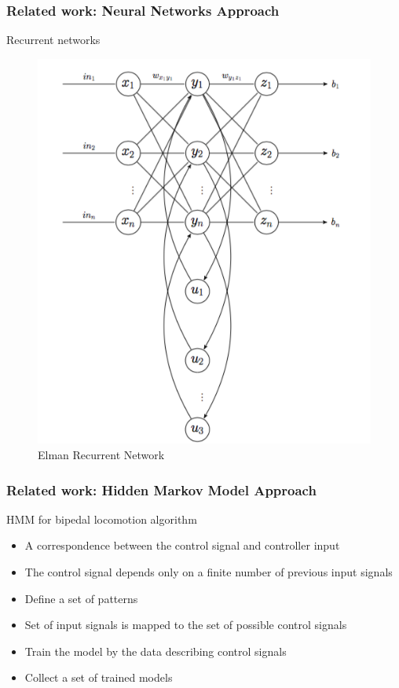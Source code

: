 \documentclass{beamer}
\begin{document}

	\begin{frame}
		\frametitle{Related work: Neural Networks Approach}
		\centering
		Recurrent networks 
		
		\begin{figure}[h!]
			\begin{minipage}[H]{\linewidth}
				\centering
				\includegraphics[width=0.5\linewidth]{presentation_images/10}
				\caption{Elman Recurrent Network}
			\end{minipage}
		\end{figure}
	\end{frame}
	

	\begin{frame}
		\frametitle{Related work: Hidden Markov Model Approach}
		\begin{block}{HMM for bipedal locomotion algorithm}
			\begin{itemize}
				\item
					A correspondence between the control signal and controller input
				\item 
					 The control signal depends only on a finite number of previous input signals
				\item
					Define a set of patterns
				\item
					Set of input signals is mapped to the set of possible control signals
				\item
					Train the model by the data describing control signals
				\item
					 Collect a set of trained models
			\end{itemize}
		\end{block}
	\end{frame}
	
\end{document}
